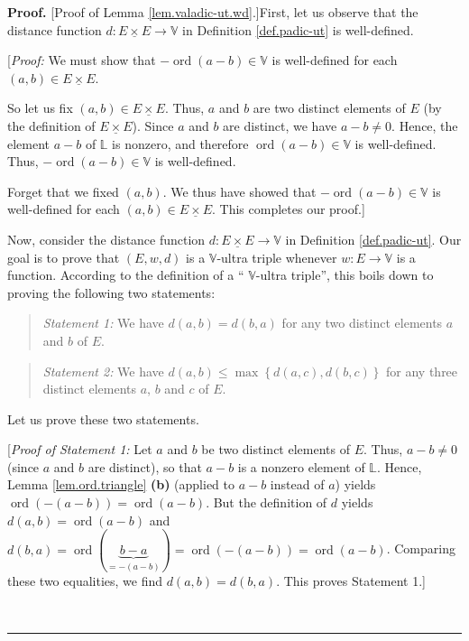 \documentclass[numbers=enddot,12pt,final,onecolumn,notitlepage]{scrartcl}%
\theoremstyle{definition}
\newenvironment{statement}{\begin{quote}}{\end{quote}}
\newenvironment{proof}[1][Proof]{\noindent\textbf{#1.} }{\ \rule{0.5em}{0.5em}}
\newcommand{\timesu}{\mathbin{\underline{\times}}}
\renewcommand{\leq}{\leqslant}
\theoremstyle{plainsl}
\begin{document}
\begin{proof}
[Proof of Lemma \ref{lem.valadic-ut.wd}.]First, let us observe that the
distance function $d:E\timesu E\rightarrow\mathbb{V}$ in Definition
\ref{def.padic-ut} is well-defined.

[\textit{Proof:} We must show that $-\operatorname*{ord}\left(  a-b\right)
\in\mathbb{V}$ is well-defined for each $\left(  a,b\right)  \in E\timesu E$.

So let us fix $\left(  a,b\right)  \in E\timesu E$. Thus, $a$ and $b$ are two
distinct elements of $E$ (by the definition of $E\timesu E$). Since $a$ and
$b$ are distinct, we have $a-b\neq0$. Hence, the element $a-b$ of $\mathbb{L}$
is nonzero, and therefore $\operatorname*{ord}\left(  a-b\right)
\in\mathbb{V}$ is well-defined. Thus, $-\operatorname*{ord}\left(  a-b\right)
\in\mathbb{V}$ is well-defined.

Forget that we fixed $\left(  a,b\right)  $. We thus have showed that
$-\operatorname*{ord}\left(  a-b\right)  \in\mathbb{V}$ is well-defined for
each $\left(  a,b\right)  \in E\timesu E$. This completes our proof.]

Now, consider the distance function $d:E\timesu E\rightarrow\mathbb{V}$ in
Definition \ref{def.padic-ut}. Our goal is to prove that $\left(
E,w,d\right)  $ is a $\mathbb{V}$-ultra triple whenever $w:E\rightarrow
\mathbb{V}$ is a function. According to the definition of a \textquotedblleft%
$\mathbb{V}$-ultra triple\textquotedblright, this boils down to proving the
following two statements:

\begin{statement}
\textit{Statement 1:} We have $d\left(  a,b\right)  =d\left(  b,a\right)  $
for any two distinct elements $a$ and $b$ of $E$.
\end{statement}

\begin{statement}
\textit{Statement 2:} We have $d\left(  a,b\right)  \leq\max\left\{  d\left(
a,c\right)  ,d\left(  b,c\right)  \right\}  $ for any three distinct elements
$a$, $b$ and $c$ of $E$.
\end{statement}

Let us prove these two statements.

[\textit{Proof of Statement 1:} Let $a$ and $b$ be two distinct elements of
$E$. Thus, $a-b\neq0$ (since $a$ and $b$ are distinct), so that $a-b$ is a
nonzero element of $\mathbb{L}$. Hence, Lemma \ref{lem.ord.triangle}
\textbf{(b)} (applied to $a-b$ instead of $a$) yields $\operatorname*{ord}%
\left(  -\left(  a-b\right)  \right)  =\operatorname*{ord}\left(  a-b\right)
$. But the definition of $d$ yields $d\left(  a,b\right)  =\operatorname*{ord}%
\left(  a-b\right)  $ and $d\left(  b,a\right)  =\operatorname*{ord}\left(
\underbrace{b-a}_{=-\left(  a-b\right)  }\right)  =\operatorname*{ord}\left(
-\left(  a-b\right)  \right)  =\operatorname*{ord}\left(  a-b\right)  $.
Comparing these two equalities, we find $d\left(  a,b\right)  =d\left(
b,a\right)  $. This proves Statement 1.] \medskip


\end{proof}
\end{document}

